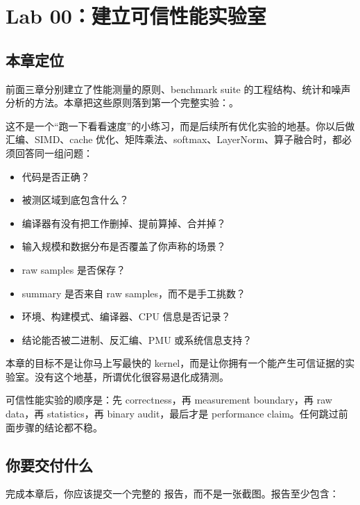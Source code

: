 \section{Lab 00：建立可信性能实验室}

\subsection{本章定位}

前面三章分别建立了性能测量的原则、benchmark suite 的工程结构、统计和噪声分析的方法。本章把这些原则落到第一个完整实验：。

这不是一个“跑一下看看速度”的小练习，而是后续所有优化实验的地基。你以后做汇编、SIMD、cache 优化、矩阵乘法、softmax、LayerNorm、算子融合时，都必须回答同一组问题：

\begin{itemize}
  \item 代码是否正确？
  \item 被测区域到底包含什么？
  \item 编译器有没有把工作删掉、提前算掉、合并掉？
  \item 输入规模和数据分布是否覆盖了你声称的场景？
  \item raw samples 是否保存？
  \item summary 是否来自 raw samples，而不是手工挑数？
  \item 环境、构建模式、编译器、CPU 信息是否记录？
  \item 结论能否被二进制、反汇编、PMU 或系统信息支持？
\end{itemize}

本章的目标不是让你马上写最快的 kernel，而是让你拥有一个能产生可信证据的实验室。没有这个地基，所谓优化很容易退化成猜测。

\begin{keyidea}
可信性能实验的顺序是：先 correctness，再 measurement boundary，再 raw data，再 statistics，再 binary audit，最后才是 performance claim。任何跳过前面步骤的结论都不稳。
\end{keyidea}

\subsection{你要交付什么}

完成本章后，你应该提交一个完整的  报告，而不是一张截图。报告至少包含：

